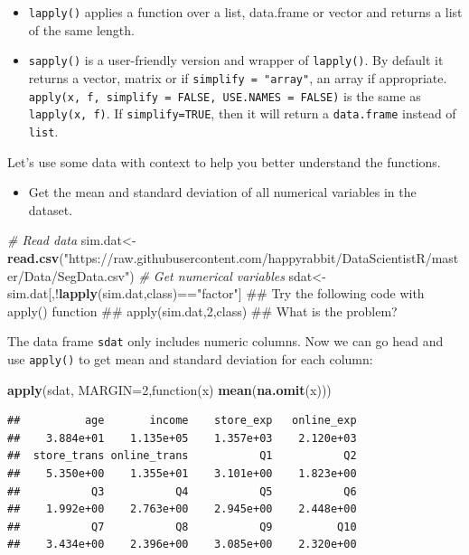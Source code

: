 \documentclass[12pt,]{krantz}
\newenvironment{Shaded}{\begin{snugshade}}{\end{snugshade}}
\newcommand{\KeywordTok}[1]{\textcolor[rgb]{0.13,0.29,0.53}{\textbf{{#1}}}}
\newcommand{\DataTypeTok}[1]{\textcolor[rgb]{0.13,0.29,0.53}{{#1}}}
\newcommand{\DecValTok}[1]{\textcolor[rgb]{0.00,0.00,0.81}{{#1}}}
\newcommand{\StringTok}[1]{\textcolor[rgb]{0.31,0.60,0.02}{{#1}}}
\newcommand{\CommentTok}[1]{\textcolor[rgb]{0.56,0.35,0.01}{\textit{{#1}}}}
\newcommand{\NormalTok}[1]{{#1}}
\providecommand{\tightlist}{%
  \setlength{\itemsep}{0pt}\setlength{\parskip}{0pt}}
\theoremstyle{definition}
\theoremstyle{definition}
\theoremstyle{remark}
\begin{document}
\begin{itemize}
\tightlist
\item
  \texttt{lapply()} applies a function over a list, data.frame or vector
  and returns a list of the same length.
\item
  \texttt{sapply()} is a user-friendly version and wrapper of
  \texttt{lapply()}. By default it returns a vector, matrix or if
  \texttt{simplify\ =\ "array"}, an array if appropriate.
  \texttt{apply(x,\ f,\ simplify\ =\ FALSE,\ USE.NAMES\ =\ FALSE)} is
  the same as \texttt{lapply(x,\ f)}. If \texttt{simplify=TRUE}, then it
  will return a \texttt{data.frame} instead of \texttt{list}.
\end{itemize}

Let's use some data with context to help you better understand the
functions.

\begin{itemize}
\tightlist
\item
  Get the mean and standard deviation of all numerical variables in the
  dataset.
\end{itemize}

\begin{Shaded}
\begin{Highlighting}[]
\CommentTok{# Read data}
\NormalTok{sim.dat<-}\KeywordTok{read.csv}\NormalTok{(}\StringTok{"https://raw.githubusercontent.com/happyrabbit/DataScientistR/master/Data/SegData.csv"}\NormalTok{)}
\CommentTok{# Get numerical variables}
\NormalTok{sdat<-sim.dat[,!}\KeywordTok{lapply}\NormalTok{(sim.dat,class)==}\StringTok{"factor"}\NormalTok{]}
\NormalTok{## Try the following code with apply() function}
\NormalTok{## apply(sim.dat,2,class)}
\NormalTok{## What is the problem?}
\end{Highlighting}
\end{Shaded}

The data frame \texttt{sdat} only includes numeric columns. Now we can
go head and use \texttt{apply()} to get mean and standard deviation for
each column:

\begin{Shaded}
\begin{Highlighting}[]
\KeywordTok{apply}\NormalTok{(sdat, }\DataTypeTok{MARGIN=}\DecValTok{2}\NormalTok{,function(x) }\KeywordTok{mean}\NormalTok{(}\KeywordTok{na.omit}\NormalTok{(x)))}
\end{Highlighting}
\end{Shaded}

\begin{verbatim}
##          age       income    store_exp   online_exp 
##    3.884e+01    1.135e+05    1.357e+03    2.120e+03 
##  store_trans online_trans           Q1           Q2 
##    5.350e+00    1.355e+01    3.101e+00    1.823e+00 
##           Q3           Q4           Q5           Q6 
##    1.992e+00    2.763e+00    2.945e+00    2.448e+00 
##           Q7           Q8           Q9          Q10 
##    3.434e+00    2.396e+00    3.085e+00    2.320e+00
\end{verbatim}
\end{document}
